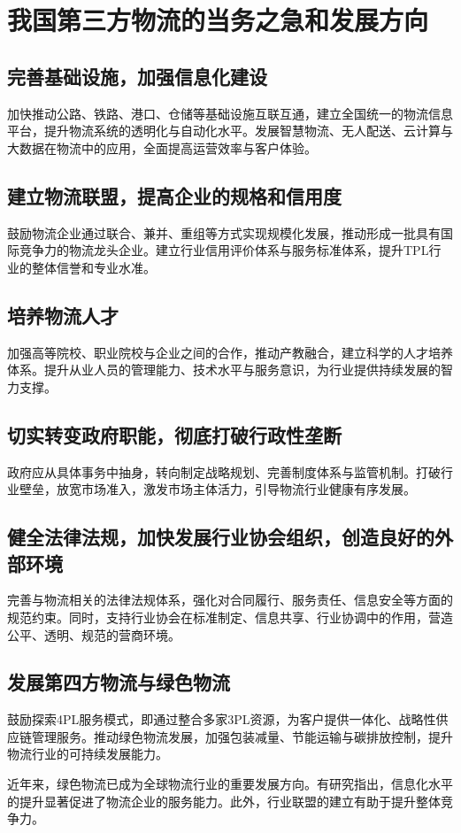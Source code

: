 \documentclass[UTF-8]{CUFEpaper}
\begin{document}
\section{我国第三方物流的当务之急和发展方向}
\subsection{完善基础设施，加强信息化建设}
加快推动公路、铁路、港口、仓储等基础设施互联互通，建立全国统一的物流信息平台，提升物流系统的透明化与自动化水平。发展智慧物流、无人配送、云计算与大数据在物流中的应用，全面提高运营效率与客户体验。

\subsection{建立物流联盟，提高企业的规格和信用度}
鼓励物流企业通过联合、兼并、重组等方式实现规模化发展，推动形成一批具有国际竞争力的物流龙头企业。建立行业信用评价体系与服务标准体系，提升TPL行业的整体信誉和专业水准。

\subsection{培养物流人才}
加强高等院校、职业院校与企业之间的合作，推动产教融合，建立科学的人才培养体系。提升从业人员的管理能力、技术水平与服务意识，为行业提供持续发展的智力支撑。

\subsection{切实转变政府职能，彻底打破行政性垄断}
政府应从具体事务中抽身，转向制定战略规划、完善制度体系与监管机制。打破行业壁垒，放宽市场准入，激发市场主体活力，引导物流行业健康有序发展。

\subsection{健全法律法规，加快发展行业协会组织，创造良好的外部环境}
完善与物流相关的法律法规体系，强化对合同履行、服务责任、信息安全等方面的规范约束。同时，支持行业协会在标准制定、信息共享、行业协调中的作用，营造公平、透明、规范的营商环境。

\subsection{发展第四方物流与绿色物流}
鼓励探索4PL服务模式，即通过整合多家3PL资源，为客户提供一体化、战略性供应链管理服务。推动绿色物流发展，加强包装减量、节能运输与碳排放控制，提升物流行业的可持续发展能力。\par
近年来，绿色物流已成为全球物流行业的重要发展方向\parencite{wang2021}。有研究指出，信息化水平的提升显著促进了物流企业的服务能力\parencite{li2020}。此外，行业联盟的建立有助于提升整体竞争力\parencite{zhang2019}。

\clearpage
{}
{} %
\printbibliography
\end{document}

